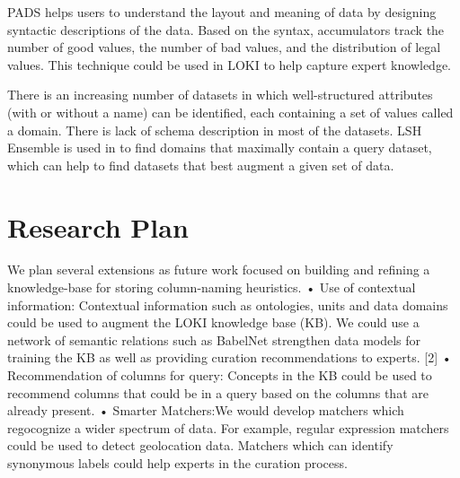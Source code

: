 \documentclass{vldb}
\begin{document}
PADS \cite{fisher2005pads} helps users to understand the layout and meaning of data by designing syntactic descriptions of the data.
Based on the syntax, accumulators track the number of good values, the number of bad values, and the distribution of legal values.
This technique could be used in LOKI to help capture expert knowledge.

There is an increasing number of datasets in which well-structured attributes
(with or without a name) can be identified, each containing a set of values called a domain. There is lack of schema description in most of the datasets.
LSH Ensemble is used in \cite{zhu2016lsh} to find domains that maximally contain a query dataset, which can help to find datasets that best augment a given set of data.

\section{Research Plan}
We plan several extensions as future work focused on building and
refining a knowledge-base for storing column-naming heuristics.
• Use of contextual information: Contextual information
such as ontologies, units and data domains could be used to augment
the LOKI knowledge base (KB). We could use a network of
semantic relations such as BabelNet strengthen data models for
training the KB as well as providing curation recommendations
to experts. [2] • Recommendation of columns for query: Concepts
in the KB could be used to recommend columns that could be
in a query based on the columns that are already present. • Smarter
Matchers:We would develop matchers which regocognize a wider
spectrum of data. For example, regular expression matchers could
be used to detect geolocation data. Matchers which can identify
synonymous labels could help experts in the curation process.
\end{document}
